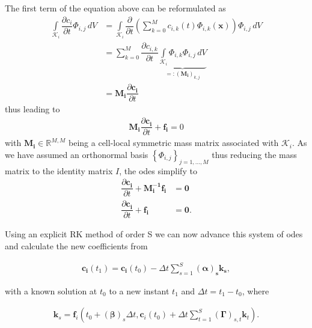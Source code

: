 	The first term of the equation above can be reformulated as 
	\begin{align*}
		\int\limits_{\mathcal{K}_i} \dfrac{\partial c_i}{\partial t}\Phi_{i,j} \, dV &= \int\limits_{\mathcal{K}_i} \dfrac{\partial}{\partial t} \left(\sum\limits_{k=0}^{M}c_{i,k}(t)\Phi_{i,k}(\mathbf{x})\right)\Phi_{i,j} \, dV \\
		&= \sum\limits_{k=0}^{M}\dfrac{\partial c_{i,k}}{\partial t}\underbrace{\int\limits_{\mathcal{K}_i}\Phi_{i,k}\Phi_{i,j}\, dV}_{=: (\mathbf{M_i})_{k,j}} \\
		&= \mathbf{M_i} \dfrac{\partial \mathbf{c_i}}{\partial t}
	\end{align*}
	thus leading to 
	\begin{align}
		\mathbf{M_i} \dfrac{\partial \mathbf{c_i}}{\partial t} + \mathbf{f_i} = 0
	\end{align}
	with $\mathbf{M_i}\in \mathbb{R}^{M,M}$ being a cell-local symmetric mass matrix associated with $\mathcal{K}_i$. As we have assumed an orthonormal basis $\left\{\Phi_{i,j}\right\}_{j=1,...,M}$ thus reducing the mass matrix to the identity matrix $I$, the \gls{ode}s simplify to
	\begin{align}
		\dfrac{\partial \mathbf{c_i}}{\partial t} + \mathbf{M_i^{-1}f_i}&=\mathbf{0}\\
		\dfrac{\partial \mathbf{c_i}}{\partial t} + \mathbf{f_i}&=\mathbf{0}.	
	\end{align}
	
	Using an explicit RK method of order S we can now advance this system of \gls{ode}s and calculate the new coefficients from
	
	\begin{align}
		\mathbf{c_i}(t_1) = \mathbf{c_i}(t_0)-\Delta t \sum\limits_{s=1}^{S}\mathbf{(\alpha)_s k_s}, 
	\end{align}
	
	with a known solution at $t_0$ to a new instant $t_1$ and $\Delta t = t_1 - t_0$, where
	
	\begin{align}
		\mathbf{k}_s = \mathbf{f}_i \left( t_0 +(\mathbf{\beta})_s \Delta t, \mathbf{c}_i (t_0) + \Delta t \sum\limits_{t = 1}^{S}\boldsymbol{(\Gamma)}_{s,t}\mathbf{k}_t\right).
	\end{align}
	

